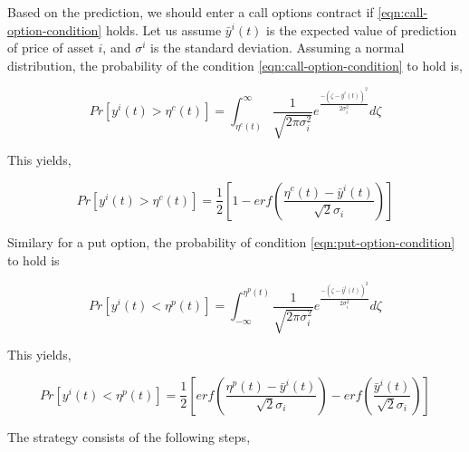 \documentclass{article}
\begin{document}
Based on the prediction, we should enter a call options contract if
\ref{eqn:call-option-condition} holds. Let us assume $\bar{y}^{i}(t)$
is the expected value of prediction of price of asset $i$, and
$\sigma^{i}$ is the standard deviation. Assuming a normal
distribution, the probability of the condition
\ref{eqn:call-option-condition} to hold is,

\begin{equation}\label{eqn:call-option-prob-intg}
Pr[ y^{i}(t) > \eta^{c}(t) ] = \int_{\eta^{c}(t)}^{\infty}
\frac{1}{\sqrt{2\pi\sigma_{i}^{2}}}
e^{\frac{-(\zeta-\bar{y}^{i}(t))^{2}}{2\sigma_{i}^{2}}} d\zeta
\end{equation}

This yields,

\begin{equation}\label{eqn:call-option-prob}
Pr[ y^{i}(t) > \eta^{c}(t) ] = \frac{1}{2} [ 1 - erf(
  \frac{\eta^{c}(t)-\bar{y}^{i}(t)}{\sqrt{2} \sigma_{i}} ) ]
\end{equation}

Similary for a put option, the probability of
condition \ref{eqn:put-option-condition} to hold is

\begin{equation}\label{eqn:put-option-prob-intg}
Pr[ y^{i}(t) < \eta^{p}(t) ] =
\int_{-\infty}^{\eta^{p}(t)} \frac{1}{\sqrt{2\pi\sigma_{i}^{2}}}
e^{\frac{-(\zeta-\bar{y}^{i}(t))^{2}}{2\sigma_{i}^{2}}} d\zeta
\end{equation}

This yields,

\begin{equation}\label{eqn:put-option-prob}
Pr[ y^{i}(t) < \eta^{p}(t) ] = \frac{1}{2} [ erf(
  \frac{\eta^{p}(t)-\bar{y}^{i}(t)}{\sqrt{2} \sigma_{i}} ) -
  erf( \frac{\bar{y}^{i}(t)}{\sqrt{2} \sigma_{i}} ) ]
\end{equation}

The strategy consists of the following steps,
\end{document}
